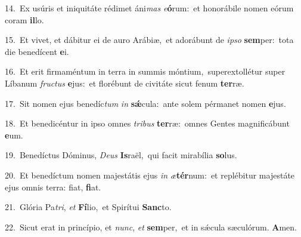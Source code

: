 {\numbfont\textcolor{\numbcolor}{14.}}~Ex usúris et iniquitáte rédimet áni\textit{mas} \textit{e}\-\textbf{ó}rum:~\star et honorábile nomen eórum coram \textbf{il}\-lo.\par
{\numbfont\textcolor{\numbcolor}{15.}}~Et vivet, et dábitur ei de auro Arábiæ,~\dagger et adorábunt de \textit{ip}\-\textit{so} \textbf{sem}\-per:~\star tota die benedícent \textbf{e}\-i.\par
{\numbfont\textcolor{\numbcolor}{16.}}~Et erit firmaméntum in terra in summis móntium,~\dagger superextollétur super Líbanum \textit{fruc}\-\textit{tus} \textbf{e}\-jus:~\star et florébunt de civitáte sicut fenum \textbf{ter}\-ræ.\par
{\numbfont\textcolor{\numbcolor}{17.}}~Sit nomen ejus benedíc\textit{tum} \textit{in} \textbf{sǽ}\-cula:~\star ante solem pérmanet nomen \textbf{e}\-jus.\par
{\numbfont\textcolor{\numbcolor}{18.}}~Et benedicéntur in ipso omnes \textit{tri}\-\textit{bus} \textbf{ter}\-ræ:~\star omnes Gentes magnificábunt \textbf{e}\-um.\par
{\numbfont\textcolor{\numbcolor}{19.}}~Benedíctus Dóminus, \textit{De}\-\textit{us} \textbf{Is}\-raël,~\star qui facit mirabília \textbf{so}\-lus.\par
{\numbfont\textcolor{\numbcolor}{20.}}~Et benedíctum nomen majestátis ejus \textit{in} \textit{æ}\-\textbf{tér}num:~\star et replébitur majestáte ejus omnis terra: fiat, \textbf{fi}\-at.\par
{\numbfont\textcolor{\numbcolor}{21.}}~Glória Pa\-\textit{tri}\-, \textit{et} \textbf{Fí}\-lio,~\star et Spirítui \textbf{Sanc}\-to.\par
{\numbfont\textcolor{\numbcolor}{22.}}~Sicut erat in princípio, et \textit{nunc}\-, \textit{et} \textbf{sem}\-per,~\star et in sǽcula sæculórum. \textbf{A}\-men.\par
